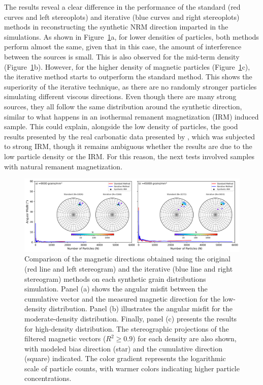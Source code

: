 The results reveal a clear difference in the performance of the standard (red curves and left stereoplots) and iterative (blue curves and right stereoplots) methods in reconstructing the synthetic NRM direction imparted in the simulations. As shown in Figure~\ref{synthetic-data-stereograms}a, for lower densities of particles, both methods perform almost the same, given that in this case, the amount of interference between the sources is small. This is also observed for the mid-term density (Figure~\ref{synthetic-data-stereograms}b). However, for the higher density of magnetic particles (Figure~\ref{synthetic-data-stereograms}c), the iterative method starts to outperform the standard method. This shows the superiority of the iterative technique, as there are no randomly stronger particles simulating different viscous directions. Even though there are many strong sources, they all follow the same distribution around the synthetic direction, similar to what happens in an isothermal remanent magnetization (IRM) induced sample. This could explain, alongside the low density of particles, the good results presented by the real carbonatic data presented by \citet{Souza-Junior2024}, which was subjected to strong IRM, though it remains ambiguous whether the results are due to the low particle density or the IRM. For this reason, the next tests involved samples with natural remanent magnetization.

\begin{figure}[tb!]
  \centering
  \includegraphics[width=1.0\linewidth]{paper/figures/synthetic-different-densities-stereoplot.png}
  \caption{
Comparison of the magnetic directions obtained using the original (red line and left stereogram) and the iterative (blue line and right stereogram) methods on each synthetic grain distributions simulation. Panel (a) shows the angular misfit between the cumulative vector and the measured magnetic direction for the low-density distribution. Panel (b) illustrates the angular misfit for the moderate-density distribution. Finally, panel (c) presents the results for high-density distribution. The stereographic projections of the filtered magnetic vectors ($R^2 \geq 0.9$) for each density are also shown, with modeled bias direction (star) and the cumulative direction (square) indicated. The color gradient represents the logarithmic scale of particle counts, with warmer colors indicating higher particle concentrations.
  }
  \label{synthetic-data-stereograms}
\end{figure}


